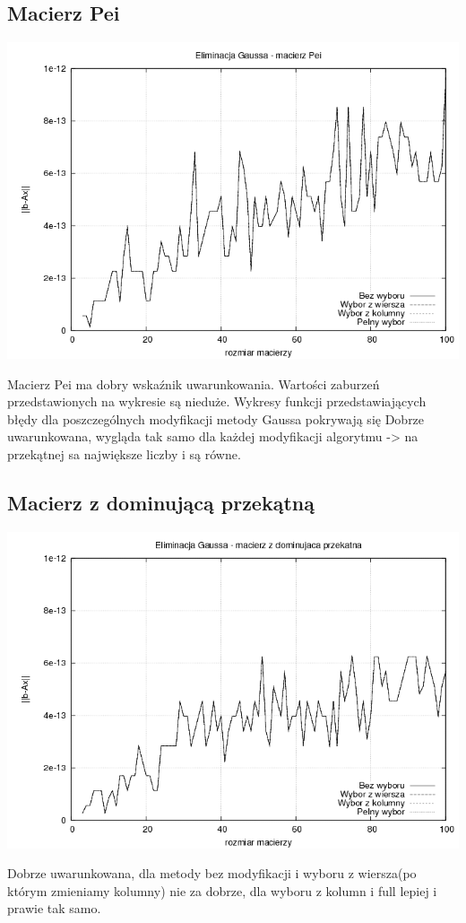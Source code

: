 \documentclass[a4paper,10pt]{article}
\begin{document}
    \subsection{Macierz Pei}
        \begin{center}
            \includegraphics[width=140mm]{pei_plot.png}
        \end{center}
            Macierz Pei ma dobry wskaźnik uwarunkowania. Wartości zaburzeń przedstawionych na wykresie są nieduże. Wykresy funkcji przedstawiających błędy dla poszczególnych modyfikacji metody Gaussa pokrywają się
        Dobrze uwarunkowana, wygląda tak samo dla każdej modyfikacji algorytmu -> na przekątnej sa największe liczby i są równe.
    \subsection{Macierz z dominującą przekątną}
        \begin{center}
            \includegraphics[width=140mm]{dominating_plot.png}
        \end{center}
        Dobrze uwarunkowana, dla metody bez modyfikacji i wyboru z wiersza(po którym zmieniamy kolumny) nie za dobrze, dla wyboru z kolumn i full lepiej i prawie tak samo.
\end{document}
